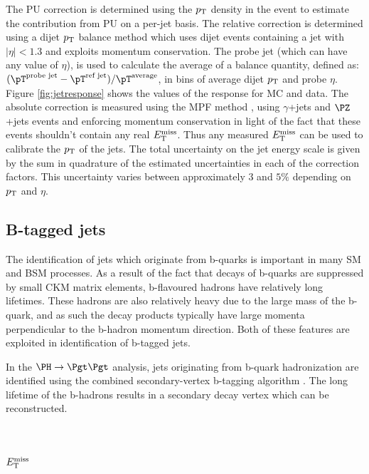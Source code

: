 The \ac{PU} correction is determined using the $p_{\mathrm{T}}$ density in the event to
estimate the contribution from \ac{PU} on a per-jet basis. The relative
correction is determined using a dijet $p_{\mathrm{T}}$ balance method which uses dijet
events containing a jet with $|\eta| < 1.3$ and exploits momentum conservation.
The probe jet (which can have any value of $\eta$), is used to calculate the
average of a balance quantity, defined as:
$(\pT^{\text{probe jet}}-\pT^{\text{ref jet}})/\pT^{\text{average}}$, in bins of
average dijet $p_{\mathrm{T}}$ and probe $\eta$. Figure \ref{fig:jetresponse} shows the
values of the response for \ac{MC} and data. The absolute correction is measured
using the \ac{MPF} method \cite{Abe:1992sj}, using $\gamma$+jets and $\PZ$+jets
events and enforcing momentum conservation in light of the fact that these
events shouldn't contain any real $E_{\mathrm{T}}^{\text{miss}}$. Thus any measured $E_{\mathrm{T}}^{\text{miss}}$ can be used to
calibrate the $p_{\mathrm{T}}$ of the jets. The total uncertainty on the jet energy scale
is given by the sum in quadrature of the estimated uncertainties in each of the
correction factors. This uncertainty varies between approximately $3$ and $5\%$
depending on $p_{\mathrm{T}}$ and $\eta$. 


\subsection{B-tagged jets}
\label{sec:btag}

The identification of jets which originate from b-quarks is important in many
\ac{SM} and \ac{BSM} processes. As a result of the fact that decays of b-quarks
are suppressed by small CKM matrix elements, b-flavoured hadrons have relatively
long lifetimes. These hadrons are also relatively heavy due to the large mass of
the b-quark, and as such the decay products typically have large momenta
perpendicular to the b-hadron momentum direction. Both of these features are
exploited in identification of b-tagged jets.

In the $\PH \to \Pgt\Pgt$ analysis, jets originating from b-quark
hadronization are identified using the combined secondary-vertex b-tagging
algorithm \cite{bjets}. The long lifetime of the b-hadrons results in a
secondary decay vertex which can be reconstructed.

\section{$E_{\mathrm{T}}^{\text{miss}}$}
\label{sec:met}

